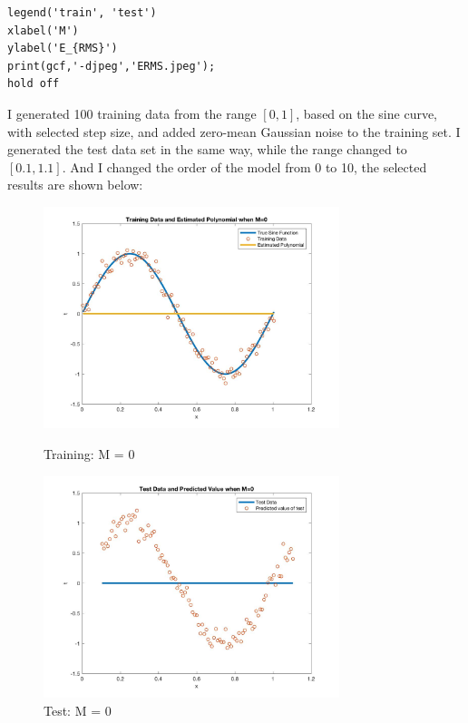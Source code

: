 \documentclass[a4paper]{article}
\begin{document}
\begin{spacing}{2.0}
\begin{lstlisting}
legend('train', 'test')
xlabel('M')
ylabel('E_{RMS}')
print(gcf,'-djpeg','ERMS.jpeg');
hold off
	\end{lstlisting}
	I generated 100 training data from the range $[0, 1]$, based on the sine curve, with selected step size, and added zero-mean Gaussian noise to the training set. I generated the test data set in the same way, while the range changed to $[0.1, 1.1]$. And I changed the order of the model from 0 to 10, the selected results are shown below: 
	\begin{figure}[H]
	    \begin{minipage}[t]{0.5\textwidth}
	        \centering
	        \includegraphics[width=3.4in]{0train.jpeg}
	        \caption{Training: M = 0}
	        \label{fig:side:a}
	    \end{minipage}%
	  \begin{minipage}[t]{0.5\textwidth}
	      \centering
	      \includegraphics[width=3.4in]{0test.jpeg}
	      \caption{Test: M = 0}
	      \label{fig:side:b}
	    \end{minipage}
	\end{figure}
	

\end{spacing}
\end{document}
